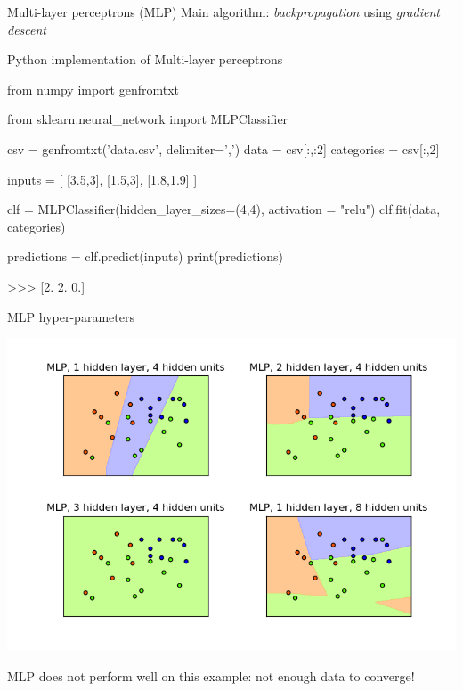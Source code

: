 \documentclass[compress,xcolor=table]{beamer}
\begin{document}
\begin{frame}{Multi-layer perceptrons (MLP)}
{        Main algorithm: \emph{backpropagation} using \emph{gradient descent}
    }

\end{frame}

\begin{frame}[fragile]{Python implementation of Multi-layer perceptrons}

\begin{pythoncode}
from numpy import genfromtxt

from sklearn.neural_network import MLPClassifier

csv = genfromtxt('data.csv', delimiter=',')
data = csv[:,:2]
categories = csv[:,2]

inputs = [ [3.5,3], [1.5,3], [1.8,1.9] ]

clf = MLPClassifier(hidden_layer_sizes=(4,4),
                    activation = "relu")
clf.fit(data, categories)

predictions = clf.predict(inputs)
print(predictions)

>>>  [2.  2.  0.]
\end{pythoncode}

\end{frame}


\begin{frame}{MLP hyper-parameters}
    \begin{center}
        \includegraphics[width=0.8\linewidth]{mlp}
    \end{center}

    \pause
    MLP does not perform well on this example: not enough data to converge!
\end{frame}
\end{document}

